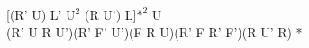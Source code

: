 [(R' U) L' $\text{U}^2$ (R U') L]$\text{*}^2$ U\\
(R' U R U')(R' F' U')(F R U)(R' F R' F')(R U' R) *\\

